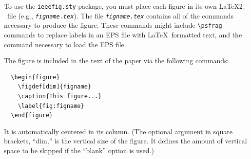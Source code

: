 \documentclass[%
	final,
	notitlepage,
	narroweqnarray,
	inline,
	twoside,
	]{ieee}
\newcommand{\latexiie}{\LaTeX2{\Large$_\varepsilon$}}
\begin{document}
To use the \texttt{ieeefig.sty} package, you must place each figure in
its own \latexiie\ file (e.g., \texttt{\emph{figname.tex}}). The file
\texttt{\emph{figname.tex}} contains all of the commands necessary to
produce the figure. These commands might include \verb|\psfrag|
commands to replace labels in an EPS file with \LaTeX\ formatted text,
and the command necessary to load the EPS file.

The figure is included in the text of the paper via the following
commands:
\begin{verbatim}
  \begin{figure}
    \figdef[dim]{figname}
    \caption{This figure...}
    \label{fig:figname}
  \end{figure}
\end{verbatim}
It is automatically centered in its column. (The optional argument in
square brackets, ``dim,'' is the vertical size of the figure. It
defines the amount of vertical space to be skipped if the ``blank''
option is used.)
\end{document}
